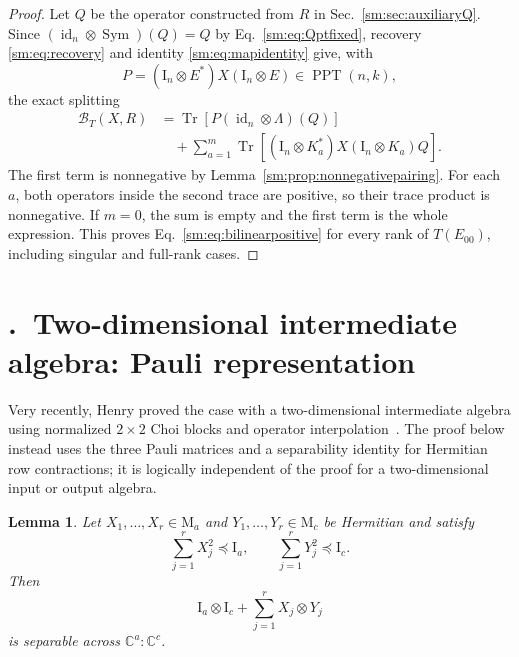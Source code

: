 \documentclass[aps,prl,reprint,superscriptaddress,nofootinbib]{revtex4-2}
\newcommand{\M}{\mathrm{M}}
\newcommand{\I}{\mathrm{I}}
\newcommand{\C}{\mathbb C}
\newcommand{\id}{\operatorname{id}}
\newcommand{\Tr}{\operatorname{Tr}}
\newcommand{\PPT}{\operatorname{PPT}}
\newcommand{\Sym}{\operatorname{Sym}}
\newcommand{\cB}{\mathcal B}
\newtheorem{lemma}[theorem]{Lemma}
\newcommand{\suppsection}[2]{%
 \refstepcounter{section}%
 \section*{\thesection.\ #1}%
 \label{sm:#2}}
\begin{document}
\begin{proof}
Let \(Q\) be the operator constructed from \(R\) in
Sec.~\ref{sm:sec:auxiliaryQ}.  Since
\((\id_n\otimes\Sym)(Q)=Q\) by Eq.~\eqref{sm:eq:Qptfixed}, recovery
\eqref{sm:eq:recovery} and identity \eqref{sm:eq:mapidentity} give, with
\begin{equation}
 P=(\I_n\otimes E^*)X(\I_n\otimes E)\in\PPT(n,k),
\label{sm:eq:Pcompression}
\end{equation}
the exact splitting
\begin{align}
 \cB_T(X,R)
 &=\Tr\!\left[P(\id_n\otimes\Lambda)(Q)\right]
\nonumber\\
 &\quad+\sum_{a=1}^m
 \Tr\!\left[(\I_n\otimes K_a^*)X(\I_n\otimes K_a)Q\right].
\label{sm:eq:pairingsplit}
\end{align}
The first term is nonnegative by Lemma~\ref{sm:prop:nonnegativepairing}.
For each \(a\), both operators inside the second trace are positive, so
their trace product is nonnegative.  If \(m=0\), the sum is empty and
the first term is the whole expression.  This proves
Eq.~\eqref{sm:eq:bilinearpositive} for every rank of \(T(E_{00})\), including
singular and full-rank cases.
\end{proof}

\suppsection{Two-dimensional intermediate algebra: Pauli representation}{sec:middle}

Very recently, Henry proved the case with a two-dimensional intermediate
algebra using normalized $2\times2$ Choi blocks and operator
interpolation~\cite{Henry2026}.  The proof below instead uses the three
Pauli matrices and a separability identity for Hermitian row
contractions; it is logically independent of the proof for a
two-dimensional input or output algebra.

\begin{lemma}
\label{sm:lem:rowgram}
Let \(X_1,\ldots,X_r\in\M_a\) and
\(Y_1,\ldots,Y_r\in\M_c\) be Hermitian and satisfy
\begin{equation}
 \sum_{j=1}^rX_j^2\preceq\I_a,
 \qquad
 \sum_{j=1}^rY_j^2\preceq\I_c.
\label{sm:eq:rowcontractions}
\end{equation}
Then
\begin{equation}
 \I_a\otimes\I_c+\sum_{j=1}^rX_j\otimes Y_j
\label{sm:eq:rowgramop}
\end{equation}
is separable across \(\C^a{:}\C^c\).
\end{lemma}
\end{document}
